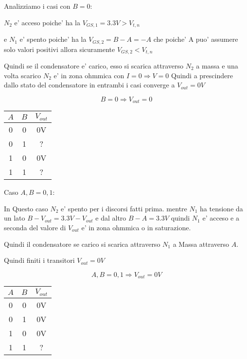 \documentclass[\main/main.tex]{subfiles}
\begin{document}
Analizziamo i casi con $B=0$:

$N_2$ e' acceso poiche' ha la $V_{GS,1} = 3.3V > V_{t,n}$

e $N_1$ e' spento poiche' ha la $V_{GS,2} = B - A = -A$ che poiche' A puo' assumere solo valori positivi allora sicuramente $V_{GS,2} < V_{t,n}$

Quindi se il condensatore e' carico, esso si scarica attraverso $N_2$ a massa
e una volta scarico $N_2$ e' in zona ohmmica con $I=0 \Rightarrow V=0$
Quindi a prescindere dallo stato del condensatore in entrambi i casi converge a $V_{out} = 0V$

\[B=0 \Rightarrow V_{out} = 0\]

\begin{center}
    \begin{tabular}{ c  c | c}
        $A$ & $B$ & $V_{out}$ \\
        \hline
        0   & 0   & 0V        \\
        0   & 1   & ?         \\
        1   & 0   & 0V        \\
        1   & 1   & ?         \\
    \end{tabular}
\end{center}

Caso $A,B = 0,1$:

In Questo caso $N_2$ e' spento per i discorsi fatti prima.
mentre  $N_1$ ha tensione da un lato $B - V_{out} = 3.3V - V_{out}$ e dal altro $B - A = 3.3V$
quindi $N_1$ e' acceso e a seconda del valore di $V_{out}$ e' in zona ohmmica o in saturazione.

Quindi il condensatore se carico si scarica attraverso $N_1$ a Massa attraverso $A$.

Quindi finiti i transitori $V_{out} = 0V$

\[A,B = 0,1 \Rightarrow V_{out} = 0V\]
\begin{center}
    \begin{tabular}{ c  c | c}
        $A$ & $B$ & $V_{out}$ \\
        \hline
        0   & 0   & 0V        \\
        0   & 1   & 0V        \\
        1   & 0   & 0V        \\
        1   & 1   & ?         \\
    \end{tabular}
\end{center}
\end{document}
